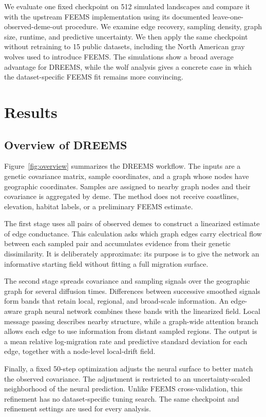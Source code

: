 \documentclass[11pt]{article}
\newcommand{\dreems}{DREEMS\xspace}
\newcommand{\feems}{FEEMS\xspace}
\begin{document}
We evaluate one fixed checkpoint on 512 simulated landscapes and compare it
with the upstream \feems implementation using its documented
leave-one-observed-deme-out procedure. We examine edge recovery, sampling
density, graph size, runtime, and predictive uncertainty. We then apply the
same checkpoint without retraining to 15 public datasets, including the North
American gray wolves used to introduce \feems. The simulations show a broad
average advantage for \dreems, while the wolf analysis gives a concrete case
in which the dataset-specific \feems fit remains more convincing.

\section{Results}

\subsection{Overview of DREEMS}

Figure~\ref{fig:overview} summarizes the \dreems workflow. The inputs are a
genetic covariance matrix, sample coordinates, and a graph whose nodes have
geographic coordinates. Samples are assigned to nearby graph nodes and their
covariance is aggregated by deme. The method does not receive coastlines,
elevation, habitat labels, or a preliminary \feems estimate.

The first stage uses all pairs of observed demes to construct a linearized
estimate of edge conductance. This calculation asks which graph edges carry
electrical flow between each sampled pair and accumulates evidence from their
genetic dissimilarity. It is deliberately approximate: its purpose is to give
the network an informative starting field without fitting a full migration
surface.

The second stage spreads covariance and sampling signals over the geographic
graph for several diffusion times. Differences between successive smoothed
signals form bands that retain local, regional, and broad-scale information.
An edge-aware graph neural network combines these bands with the linearized
field. Local message passing describes nearby structure, while a graph-wide
attention branch allows each edge to use information from distant sampled
regions. The output is a mean relative log-migration rate and predictive
standard deviation for each edge, together with a node-level local-drift
field.

Finally, a fixed 50-step optimization adjusts the neural surface to better
match the observed covariance. The adjustment is restricted to an
uncertainty-scaled neighborhood of the neural prediction. Unlike \feems
cross-validation, this refinement has no dataset-specific tuning search. The
same checkpoint and refinement settings are used for every analysis.
\end{document}
